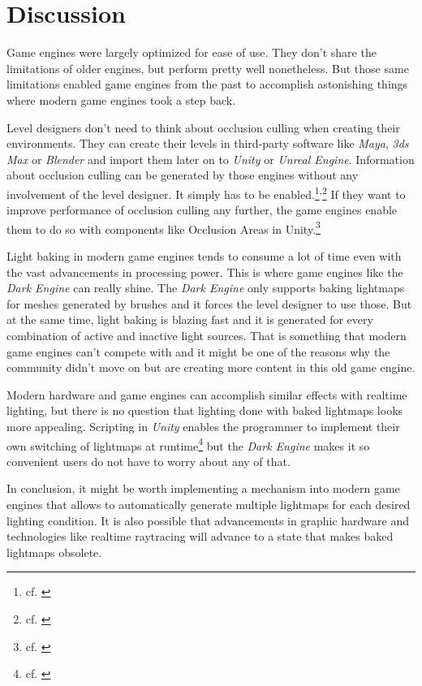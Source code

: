 \section{Discussion}

Game engines were largely optimized for ease of use. They don't share the limitations of older engines, but perform pretty well nonetheless. But those same limitations enabled game engines from the past to accomplish astonishing things where modern game engines took a step back.

Level designers don't need to think about occlusion culling when creating their environments. They can create their levels in third-party software like \textit{Maya}, \textit{3ds Max} or \textit{Blender} and import them later on to \textit{Unity} or \textit{Unreal Engine}. Information about occlusion culling can be generated by those engines without any involvement of the level designer. It simply has to be enabled.\footnote{cf. \cite{OcclusionCullingUnity}}\textsuperscript{,}\footnote{cf. \cite{OcclusionCullingUnreal}} If they want to improve performance of occlusion culling any further, the game engines enable them to do so with components like Occlusion Areas in Unity.\footnote{cf. \cite{OcclusionAreasUnity}}

Light baking in modern game engines tends to consume a lot of time even with the vast advancements in processing power. This is where game engines like the \textit{Dark Engine} can really shine. The \textit{Dark Engine} only supports baking lightmaps for meshes generated by brushes and it forces the level designer to use those. But at the same time, light baking is blazing fast and it is generated for every combination of active and inactive light sources. That is something that modern game engines can't compete with and it might be one of the reasons why the community didn't move on  but are creating more content in this old game engine.

Modern hardware and game engines can accomplish similar effects with realtime lighting, but there is no question that lighting done with baked lightmaps looks more appealing. Scripting in \textit{Unity} enables the programmer to implement their own switching of lightmaps at runtime\footnote{cf. \cite{LightmapSettingsUnity}} but the \textit{Dark Engine} makes it so convenient users do not have to worry about any of that.

In conclusion, it might be worth implementing a mechanism into modern game engines that allows to automatically generate multiple lightmaps for each desired lighting condition. It is also possible that advancements in graphic hardware and technologies like realtime raytracing will advance to a state that makes baked lightmaps obsolete.

